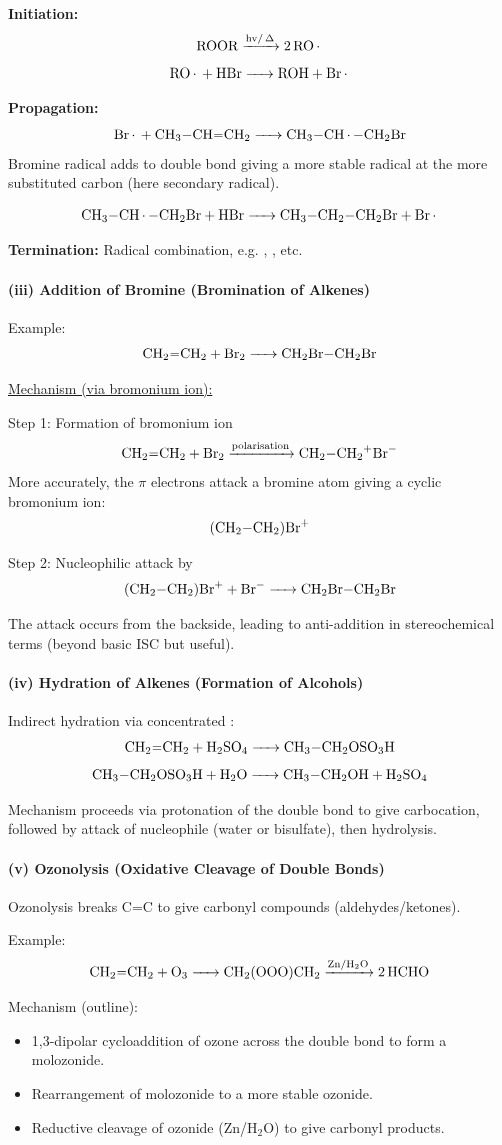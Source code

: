 \documentclass[12pt,a4paper]{article}
\begin{document}
\textbf{Initiation:}
\[
\ce{ROOR ->[hv/ \Delta] 2RO.}
\]
\[
\ce{RO. + HBr -> ROH + Br.}
\]

\textbf{Propagation:}
\[
\ce{Br. + CH3-CH=CH2 -> CH3-CH.-CH2Br}
\]
Bromine radical adds to double bond giving a more stable radical at the more substituted carbon (here secondary radical).

\[
\ce{CH3-CH.-CH2Br + HBr -> CH3-CH2-CH2Br + Br.}
\]

\textbf{Termination:} Radical combination, e.g. , , etc.

\paragraph{(iii) Addition of Bromine (Bromination of Alkenes)}
Example:
\[
\ce{CH2=CH2 + Br2 -> CH2Br-CH2Br}
\]

\underline{Mechanism (via bromonium ion):}

Step 1: Formation of bromonium ion  
\[
\ce{CH2=CH2 + Br2 ->[polarisation] CH2-CH2^{+}Br^{-}}
\]
More accurately, the $\pi$ electrons attack a bromine atom giving a cyclic bromonium ion:
\[
\ce{(CH2-CH2)Br^+}
\]

Step 2: Nucleophilic attack by   
\[
\ce{(CH2-CH2)Br^+ + Br^- -> CH2Br-CH2Br}
\]

The attack occurs from the backside, leading to anti-addition in stereochemical terms (beyond basic ISC but useful).

\paragraph{(iv) Hydration of Alkenes (Formation of Alcohols)}
Indirect hydration via concentrated :
\[
\ce{CH2=CH2 + H2SO4 -> CH3-CH2OSO3H}
\]
\[
\ce{CH3-CH2OSO3H + H2O -> CH3-CH2OH + H2SO4}
\]

Mechanism proceeds via protonation of the double bond to give carbocation, followed by attack of nucleophile (water or bisulfate), then hydrolysis.

\paragraph{(v) Ozonolysis (Oxidative Cleavage of Double Bonds)}
Ozonolysis breaks C=C to give carbonyl compounds (aldehydes/ketones).

Example:
\[
\ce{CH2=CH2 + O3 -> CH2(OOO)CH2 ->[Zn/H2O] 2HCHO}
\]

Mechanism (outline):
\begin{itemize}
    \item 1,3-dipolar cycloaddition of ozone across the double bond to form a molozonide.
    \item Rearrangement of molozonide to a more stable ozonide.
    \item Reductive cleavage of ozonide (Zn/H$_2$O) to give carbonyl products.
\end{itemize}
\end{document}
